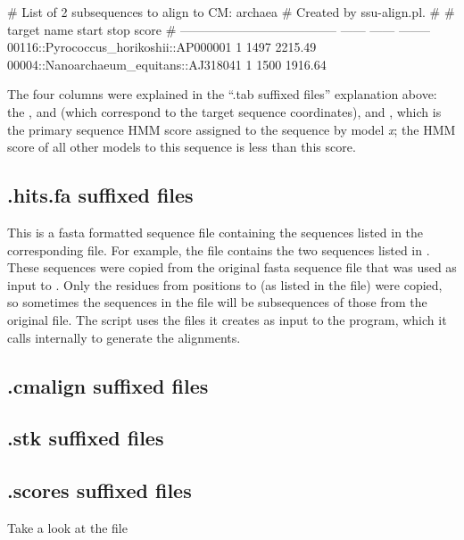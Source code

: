\begin{sreoutput}
# List of 2 subsequences to align to CM: archaea
# Created by ssu-align.pl.
#
# target name                              start    stop     score
# --------------------------------------  ------  ------  --------
  00116::Pyrococcus_horikoshii::AP000001       1    1497   2215.49
  00004::Nanoarchaeum_equitans::AJ318041       1    1500   1916.64
\end{sreoutput}

The four columns were explained in the ``.tab suffixed files''
explanation above: the ,  and
 (which correspond to the target sequence coordinates), and
, which is the primary sequence HMM score assigned to the
sequence by model \emph{x}; the HMM score of all other models to this
sequence is less than this score.

\subsection{.hits.fa suffixed files}
This is a fasta formatted sequence file containing the sequences
listed in the corresponding  file. For example, the
file  contains the two sequences
listed in . These sequences were
copied from the original fasta sequence file  that
was used as input to . Only the residues from
positions  to  (as listed in the
 file) were copied, so sometimes the sequences in the
 file will be subsequences of those from the original
file.  The  script uses the  files it
creates as input to the  program, which it calls
internally to generate the alignments.

\subsection{.cmalign suffixed files}


\subsection{.stk suffixed files}
\subsection{.scores suffixed files}


Take a look at the file 

